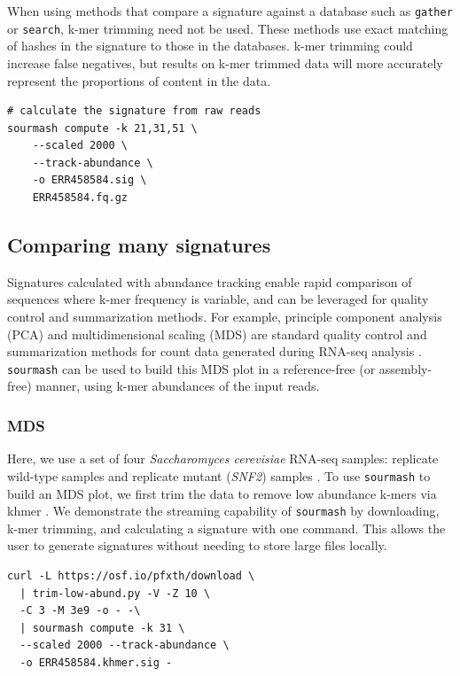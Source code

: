 \documentclass[10pt,a4paper,twocolumn]{article}
\begin{document}
When using methods that compare a signature against a database such as \lstinline{gather} or \lstinline{search}, k-mer trimming need not be used. These methods use exact matching of hashes in the signature to those in the databases. k-mer trimming could increase false negatives, but results on k-mer trimmed data will more accurately represent the proportions of content in the data.

\begin{lstlisting}
# calculate the signature from raw reads
sourmash compute -k 21,31,51 \ 
    --scaled 2000 \ 
    --track-abundance \ 
    -o ERR458584.sig \ 
    ERR458584.fq.gz
\end{lstlisting}

\subsection*{Comparing many signatures}

Signatures calculated with abundance tracking enable rapid comparison of sequences where k-mer frequency is variable, and can be leveraged for quality control and summarization methods. For example, principle component analysis (PCA) and multidimensional scaling (MDS) are standard quality control and summarization methods for count data generated during RNA-seq analysis \cite{conesa2016survey}. \lstinline{sourmash} can be used to build this MDS plot in a reference-free (or assembly-free) manner, using k-mer abundances of the input reads.

\subsubsection*{MDS}

Here, we use a set of four \textit{Saccharomyces cerevisiae} RNA-seq samples: replicate wild-type samples and replicate mutant (\textit{SNF2}) samples \cite{schurch2016many}. To use \lstinline{sourmash} to build an MDS plot, we first trim the data to remove low abundance k-mers via khmer \cite{crusoe2015khmer}. We demonstrate the streaming capability of \lstinline{sourmash} by downloading, k-mer trimming, and calculating a signature with one command. This allows the user to generate signatures without needing to store large files locally.

\begin{lstlisting}
curl -L https://osf.io/pfxth/download \ 
  | trim-low-abund.py -V -Z 10 \ 
  -C 3 -M 3e9 -o - -\ 
  | sourmash compute -k 31 \ 
  --scaled 2000 --track-abundance \ 
  -o ERR458584.khmer.sig -
\end{lstlisting}
\end{document}
